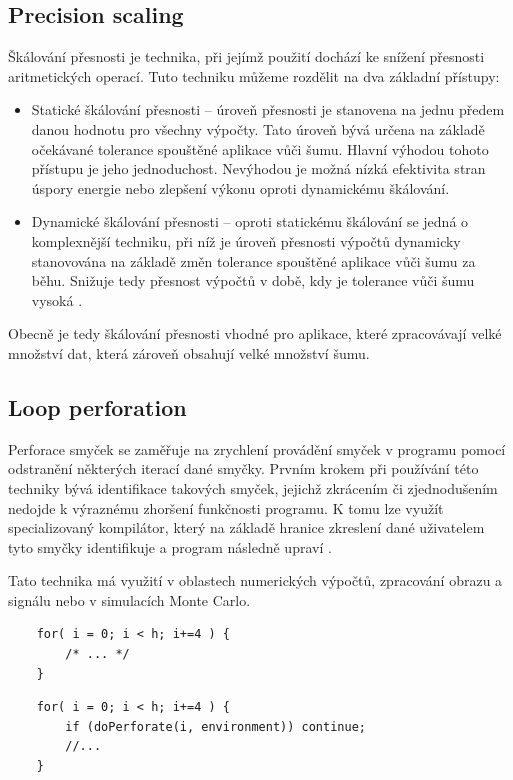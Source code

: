 \subsection*{Precision scaling}
Škálování přesnosti je technika, při jejímž použití dochází ke snížení přesnosti aritmetických operací. Tuto techniku můžeme rozdělit na dva základní přístupy:
\begin{itemize}
    \item Statické škálování přesnosti -- úroveň přesnosti je stanovena na jednu předem danou hodnotu pro všechny výpočty. Tato úroveň bývá určena na základě očekávané tolerance spouštěné aplikace vůči šumu. Hlavní výhodou tohoto přístupu je jeho jednoduchost. Nevýhodou je možná nízká efektivita stran úspory energie nebo zlepšení výkonu oproti dynamickému škálování.
    \item Dynamické škálování přesnosti -- oproti statickému škálování se jedná o komplexnější techniku, při níž je úroveň přesnosti výpočtů dynamicky stanovována na základě změn tolerance spouštěné aplikace vůči šumu za běhu. Snižuje tedy přesnost výpočtů v době, kdy je tolerance vůči šumu vysoká \cite{precision_scaling}.
\end{itemize}

Obecně je tedy škálování přesnosti vhodné pro aplikace, které zpracovávají velké množství dat, která zároveň obsahují velké množství šumu.

\subsection*{Loop perforation}
Perforace smyček se zaměřuje na zrychlení provádění smyček v programu pomocí odstranění některých iterací dané smyčky. Prvním krokem při používání této techniky bývá identifikace takových smyček, jejichž zkrácením či zjednodušením nedojde k výraznému zhoršení funkčnosti programu. K tomu lze využít specializovaný kompilátor, který na základě hranice zkreslení dané uživatelem tyto smyčky identifikuje a program následně upraví \cite{code_perforation}.

Tato technika má využití v oblastech numerických výpočtů, zpracování obrazu a signálu nebo v simulacích Monte Carlo.

\begin{verbatim}
    for( i = 0; i < h; i+=4 ) { 
        /* ... */ 
    }
\end{verbatim}

\begin{verbatim}
    for( i = 0; i < h; i+=4 ) {
        if (doPerforate(i, environment)) continue;
        //...
    }
\end{verbatim}

